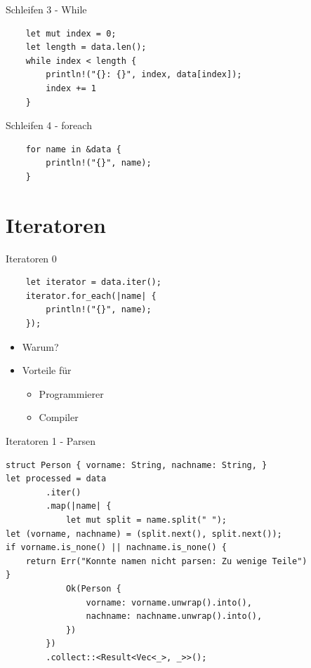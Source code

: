 \documentclass[aspectratio=1610,t]{beamer}
\begin{document}
\begin{frame}[fragile]{Schleifen 3 - While}
\begin{verbatim}
    let mut index = 0;
    let length = data.len();
    while index < length {
        println!("{}: {}", index, data[index]);
        index += 1
    }
\end{verbatim}
\end{frame}

\begin{frame}[fragile]{Schleifen 4 - foreach}
\begin{verbatim}
    for name in &data {
        println!("{}", name);
    }
\end{verbatim}
\end{frame}


{
\section{Iteratoren}
}

\begin{frame}[fragile]{Iteratoren 0}
\begin{verbatim}
    let iterator = data.iter();
    iterator.for_each(|name| {
        println!("{}", name);
    });
\end{verbatim}

\begin{itemize}
 \item Warum?
 \item Vorteile für
    \begin{itemize}
     \item Programmierer
     \item Compiler
    \end{itemize}
\end{itemize}
\end{frame}



\begin{frame}[fragile]{Iteratoren 1 - Parsen}
\begin{verbatim}
struct Person { vorname: String, nachname: String, }
let processed = data
        .iter()
        .map(|name| {
            let mut split = name.split(" ");
let (vorname, nachname) = (split.next(), split.next());
if vorname.is_none() || nachname.is_none() {
    return Err("Konnte namen nicht parsen: Zu wenige Teile")
}
            Ok(Person {
                vorname: vorname.unwrap().into(),
                nachname: nachname.unwrap().into(),
            })
        })
        .collect::<Result<Vec<_>, _>>();
\end{verbatim}
\end{frame}
\end{document}
